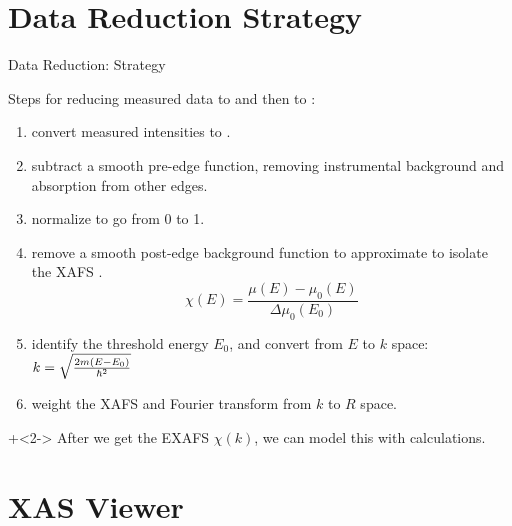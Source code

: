 \section{Data Reduction Strategy}


\begin{slide}{Data Reduction: Strategy}

  Steps for reducing measured data to {\mue} and then to {\chik}:

\begin{cenpage}{125mm}
  \begin{enumerate}
  \item convert measured intensities to {\mue}.
  \item subtract a smooth pre-edge function, removing instrumental
    background and absorption from other edges.
  \item normalize {\mue} to go from 0 to 1.\\
    {}

  \item remove a smooth post-edge background function to approximate
    {\bkg} to isolate the XAFS {\chie}.
    \[ \chi(E) = \frac{\mu(E) -\mu_0(E)}{\Delta \mu_0(E_0)} \]

  \item identify the threshold energy ${E_0}$, and convert from
    $E$ to $k$ space: $k= \sqrt{{{2m(E-E_0)}\over{\hbar^2}}}$
  \item weight the XAFS {\chik} and Fourier transform from
    ${k}$ to ${R}$ space.
  \end{enumerate}

\end{cenpage}

\vmm\vmm
\onslide+<2->
  After we get the EXAFS $\chi(k)$, we can model this with {\feff}
  calculations.

\end{slide}

\section{XAS Viewer}

